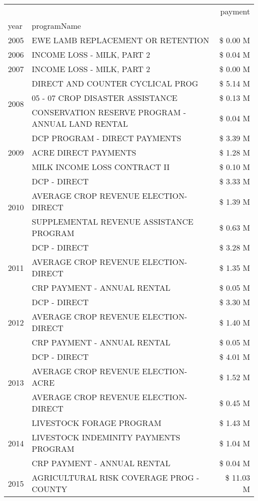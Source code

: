 \begin{tabular}{llr}
\toprule
 &  & payment \\
year & programName &  \\
\midrule
2005 & EWE LAMB REPLACEMENT OR RETENTION & \$ 0.00 M \\
\cline{1-3}
2006 & INCOME LOSS - MILK, PART 2 & \$ 0.04 M \\
\cline{1-3}
2007 & INCOME LOSS - MILK, PART 2 & \$ 0.00 M \\
\cline{1-3}
\multirow[t]{3}{*}{2008} & DIRECT AND COUNTER CYCLICAL PROG & \$ 5.14 M \\
 & 05 - 07 CROP DISASTER ASSISTANCE & \$ 0.13 M \\
 & CONSERVATION RESERVE PROGRAM - ANNUAL LAND RENTAL & \$ 0.04 M \\
\cline{1-3}
\multirow[t]{3}{*}{2009} & DCP PROGRAM - DIRECT PAYMENTS & \$ 3.39 M \\
 & ACRE DIRECT PAYMENTS & \$ 1.28 M \\
 & MILK INCOME LOSS CONTRACT II & \$ 0.10 M \\
\cline{1-3}
\multirow[t]{3}{*}{2010} & DCP - DIRECT & \$ 3.33 M \\
 & AVERAGE CROP REVENUE ELECTION-DIRECT & \$ 1.39 M \\
 & SUPPLEMENTAL REVENUE ASSISTANCE PROGRAM & \$ 0.63 M \\
\cline{1-3}
\multirow[t]{3}{*}{2011} & DCP - DIRECT & \$ 3.28 M \\
 & AVERAGE CROP REVENUE ELECTION-DIRECT & \$ 1.35 M \\
 & CRP PAYMENT - ANNUAL RENTAL & \$ 0.05 M \\
\cline{1-3}
\multirow[t]{3}{*}{2012} & DCP - DIRECT & \$ 3.30 M \\
 & AVERAGE CROP REVENUE ELECTION-DIRECT & \$ 1.40 M \\
 & CRP PAYMENT - ANNUAL RENTAL & \$ 0.05 M \\
\cline{1-3}
\multirow[t]{3}{*}{2013} & DCP - DIRECT & \$ 4.01 M \\
 & AVERAGE CROP REVENUE ELECTION-ACRE & \$ 1.52 M \\
 & AVERAGE CROP REVENUE ELECTION-DIRECT & \$ 0.45 M \\
\cline{1-3}
\multirow[t]{3}{*}{2014} & LIVESTOCK FORAGE PROGRAM & \$ 1.43 M \\
 & LIVESTOCK INDEMINITY PAYMENTS PROGRAM & \$ 1.04 M \\
 & CRP PAYMENT - ANNUAL RENTAL & \$ 0.04 M \\
\cline{1-3}
\multirow[t]{3}{*}{2015} & AGRICULTURAL RISK COVERAGE PROG - COUNTY & \$ 11.03 M \\

\end{tabular}
